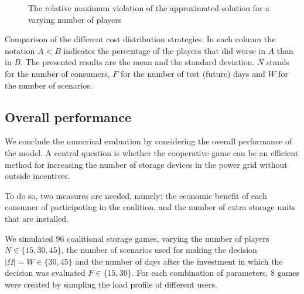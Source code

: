 \documentclass[sigconf, table]{acmart}
\begin{document}
\begin{figure}[]

  \caption{The relative maximum violation of the approximated solution for a varying number of players}
  \label{fig:rel_eps}
\end{figure}

\begin{table*}[t]
  \centering
  \caption{Comparison of the different cost distribution strategies. In each column the notation $A < B$ indicates the percentage of the players that did worse in $A$ than in $B$. The presented results are the mean and the standard deviation. $N$ stands for the number of consumers, $F$ for the number of test (future) days and $W$ for the number of scenarios.}
  \label{tab:general_performance}
  \resizebox{\linewidth}{!}{}
\end{table*}

\subsection{Overall performance}\label{sub:gp}

We conclude the numerical evaluation by considering the overall performance of the model. A central question is whether the cooperative game can be an efficient method for increasing the number of storage devices in the power grid without outside incentives.

To do so, two measures are needed, namely: the economic benefit of each consumer of participating in the coalition, and the number of extra storage units that are installed.

We simulated 96 coalitional storage games, varying the number of players $N \in \{15, 30, 45\}$, the number of scenarios used for making the decision $|\Omega| = W \in \{30, 45\}$ and the number of days after the investment in which the decision was evaluated $F \in \{15, 30\}$. For each combination of parameters, 8 games were created by sampling the load profile of different users.
\end{document}
